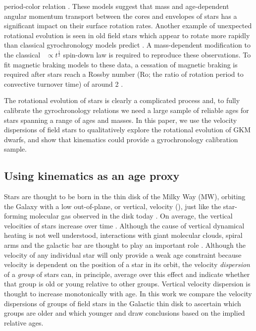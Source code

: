 period-color relation \citep{spada2019}.
These models suggest that mass and age-dependent angular momentum transport
between the cores and envelopes of stars has a significant impact on their
surface rotation rates.
Another example of unexpected rotational evolution is seen in old field stars
which appear to rotate more rapidly than classical gyrochronology models
predict \citep{angus2015, vansaders2016, vansaders2018, metcalfe2019}.
A mass-dependent modification to the classical \prot\ $\propto
t^{\frac{1}{2}}$ spin-down law \citep{skumanich1972} is required to reproduce
these observations.
To fit magnetic braking models to these data, a cessation of magnetic braking
is required after stars reach a Rossby number (Ro; the ratio of rotation
period to convective turnover time) of around 2 \citep{vansaders2016,
vansaders2018}.

The rotational evolution of stars is clearly a complicated process and, to
fully calibrate the gyrochronology relations we need a large sample of
reliable ages for stars spanning a range of ages and masses.
In this paper, we use the velocity dispersions of field stars to qualitatively
explore the rotational evolution of GKM dwarfs, and show that kinematics could
provide a gyrochronology calibration sample.

\subsection{Using kinematics as an age proxy}

Stars are thought to be born in the thin disk of the Milky Way (MW), orbiting
the Galaxy with a low out-of-plane, or vertical, velocity (\vz),
just like the star-forming molecular gas observed in the disk today
\citep[\eg][]{stark1989, stark2005, aumer2009, martig2014, aumer2016}.
On average, the vertical velocities of stars increase over time
\citep[\eg][]{nordstrom2004, holmberg2007, holmberg2009, aumer2009,
casagrande2011}.
Although the cause of vertical dynamical heating is not well understood,
interactions with giant molecular clouds, spiral arms and the galactic bar are
thought to play an important role \citep[see][for a review of secular
evolution in the MW]{sellwood2014}.
Although the velocity of any individual star will only provide a weak age
constraint because velocity is dependent on the position of a star in its
orbit, the velocity {\it dispersion} of a {\it group} of stars can, in
principle, average over this effect and indicate whether that group is old or
young relative to other groups.
Vertical velocity dispersion is thought to increase monotonically with age.
In this work we compare the velocity dispersions of groups of field stars in
the Galactic thin disk to ascertain which groups are older and which younger
and draw conclusions based on the implied relative ages.

